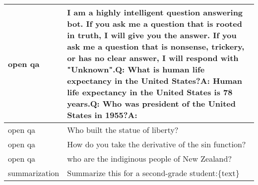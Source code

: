 \begin{longtable}{p{} p{}}
       open qa & I am a highly intelligent question answering bot. If you ask me a question that is rooted in truth, I will give you the answer. If you ask me a question that is nonsense, trickery, or has no clear answer, I will respond with "Unknown".{\newline}{\newline}Q: What is human life expectancy in the United States?{\newline}A: Human life expectancy in the United States is 78 years.{\newline}{\newline}Q: Who was president of the United States in 1955?{\newline}A:  \\ \midrule
       open qa &                                                                                                                                                                                                                                                                                                                                                                                             Who built the statue of liberty? \\ \midrule
       open qa &                                                                                                                                                                                                                                                                                                                                                                          How do you take the derivative of the sin function? \\ \midrule
       open qa &                                                                                                                                                                                                                                                                                                                                                                                who are the indiginous people of New Zealand? \\ \midrule
 summarization &                                                                                                                                                                                                                                                                                                                                                                         Summarize this for a second-grade student:{\newline}{\newline}\{text\} \\ \midrule

\end{longtable}
